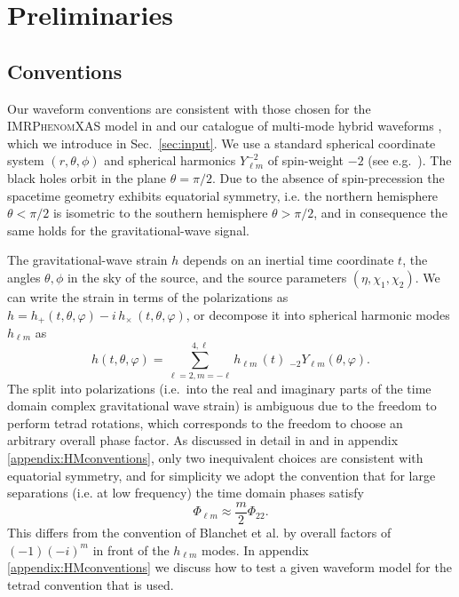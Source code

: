 \documentclass[twocolumn,prd,aps,superscriptaddress,preprintnumbers,tightenlines,showpacs,nofootinbib,eqsecnum,amsfonts,amsmath]{revtex4}
\newcommand{\phX}{\textsc{IMRPhenomXAS}\xspace}
\begin{document}
\section{Preliminaries} \label{sec:prelim}

\subsection{Conventions} \label{sec:conventions}

Our waveform conventions are consistent with those chosen for the \phX model in \cite{phenX} and our catalogue of multi-mode hybrid
waveforms \cite{hybrids}, which we introduce in Sec.~\ref{sec:input}.
We use a standard spherical coordinate system $(r,\theta,\phi)$ and spherical harmonics  $Y^{-2}_{\ell m}$ of spin-weight $-2$ (see e.g.~\cite{Wiaux:2005fm}).
%
The black holes orbit in the plane $\theta=\pi/2$. Due to the absence of spin-precession the spacetime geometry exhibits equatorial symmetry, i.e. the northern hemisphere $\theta < \pi/2$ is isometric to the southern hemisphere $\theta > \pi/2$, and in consequence the same holds for the gravitational-wave signal.

The gravitational-wave strain $h$ depends on an inertial time coordinate $t$, the angles $\theta, \phi$ in the sky of the source, and the source parameters $(\eta,\chi_1,\chi_2)$.
We can write the strain in terms of the polarizations as
 $h=h_+(t, \theta , \varphi )  - i \, h_{\times} \, (t, \theta , \varphi )$, 
 or decompose it into spherical harmonic modes $h_{\ell m}$ as
\begin{equation}\label{eq:h_harmonics}
    h(t,\theta,\varphi) = \sum_{\ell=2,m=-\ell}^{4,\ell}   h_{\ell m} \, (t) \; _{-2}Y_{\ell m} (\theta,\varphi).
\end{equation}
The split into polarizations (i.e.~into the real and imaginary parts of the time domain complex gravitational wave strain) is ambiguous due to the freedom to perform tetrad rotations, which corresponds to the freedom to choose an arbitrary overall phase factor. As discussed in detail in \cite{Bustillo:2015ova,hybrids} and in
appendix \ref{appendix:HMconventions}, only two inequivalent choices are consistent with equatorial symmetry, and for simplicity we adopt the convention that for large separations (i.e. at low frequency) the time domain phases satisfy
\begin{equation}\label{eq:tetrad_convention}
    \Phi_{\ell m} \approx  \frac{m}{2}\Phi_{2 2} .
\end{equation}
%
This differs from the convention of Blanchet et al. \cite{Blanchet:2008je} by overall factors of $(-1) (-i)^m$ in front of the $h_{\ell m}$ modes. In appendix \ref{appendix:HMconventions} we discuss how to test a given waveform model for the tetrad convention that is used.
\end{document}
